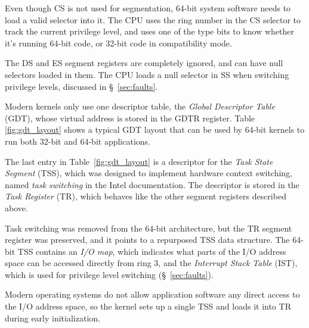 Even though CS is not used for segmentation, 64-bit system software needs to
load a valid selector into it. The CPU uses the ring number in the CS selector
to track the current privilege level, and uses one of the type bits to know
whether it's running 64-bit code, or 32-bit code in compatibility mode.


The DS and ES segment registers are completely ignored, and can have null
selectors loaded in them. The CPU loads a null selector in SS when switching
privilege levels, discussed in \S~\ref{sec:faults}.


Modern kernels only use one descriptor table, the \textit{Global Descriptor
Table} (GDT), whose virtual address is stored in the GDTR register. Table~
\ref{fig:gdt_layout} shows a typical GDT layout that can be used by 64-bit
kernels to run both 32-bit and 64-bit applications.

\begin{table}[hbt]
  \caption{
    A typical GDT layout in the 64-bit Intel Architecture.
  }
  \label{fig:gdt_layout}
\end{table}


The last entry in Table~\ref{fig:gdt_layout} is a descriptor for the
\textit{Task State Segment} (TSS), which was designed to implement hardware
context switching, named \textit{task switching} in the Intel documentation.
The descriptor is stored in the \textit{Task Register} (TR), which behaves like
the other segment registers described above.

Task switching was removed from the 64-bit architecture, but the TR segment
register was preserved, and it points to a repurposed TSS data structure. The
64-bit TSS contains an \textit{I/O map}, which indicates what parts of the I/O
address space can be accessed directly from ring 3, and the
\textit{Interrupt Stack Table} (IST), which is used for privilege level
switching (\S~\ref{sec:faults}).

Modern operating systems do not allow application software any direct access to
the I/O address space, so the kernel sets up a single TSS and loads it into TR
during early initialization.
